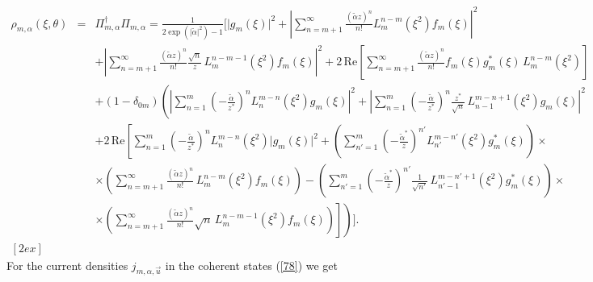 \documentclass[aps,showpacs,showkeys]{revtex4}
\begin{document}
\begin{eqnarray*}
 	\nonumber \rho_{m,\alpha}(\xi,\theta)&=&\Pi^{\dagger}_{m,\alpha} \Pi_{m,\alpha} =\frac1{2\exp(\vert\tilde{\alpha}\vert^2)-1}\Bigg[\vert g_m(\xi)\vert^2+\left\vert\sum_{n=m+1}^{\infty}\frac{\left(\tilde{\alpha}z\right)^n}{n!}L_{m}^{n-m}(\xi^2)f_m(\xi)\right\vert^2\\
 	\nonumber&&+\left\vert\sum_{n=m+1}^{\infty}\frac{\left(\tilde{\alpha} z\right)^n}{n!}\frac{\sqrt{n}}{z}\, L_{m}^{n-m-1}(\xi^2)f_m(\xi)\right\vert^2+2\,\textrm{Re}\left[\sum_{n=m+1}^{\infty}\frac{(\tilde{\alpha}z)^n}{n!}f_m(\xi)g_m^\ast(\xi)\, L_{m}^{n-m}(\xi^2)\right]\\
 	\nonumber&&+(1-\delta_{0m})\left(\left\vert\sum_{n=1}^{m}\left(-\frac{\tilde{\alpha} }{z^\ast}\right)^nL_{n}^{m-n}(\xi^2)g_m(\xi)\right\vert^2+\left\vert\sum_{n=1}^{m}\left(-\frac{\tilde{\alpha}}{z^\ast}\right)^n\frac{z^\ast}{\sqrt{n}}\,  L_{n-1}^{m-n+1}(\xi^2)g_m(\xi)\right\vert^2\right. \\
	\nonumber&&+2\, \textrm{Re}\left[\sum_{n=1}^{m}\left(-\frac{\tilde{\alpha}}{z^\ast}\right)^nL_n^{m-n}(\xi^2)\vert g_m(\xi)\vert^2+\left(\sum_{n'=1}^{m}\left(-\frac{\tilde{\alpha}^\ast}{z}\right)^{n'}L_{n'}^{m-n'}(\xi^2)g_m^\ast(\xi)\right)\times\right. \\
	\nonumber&&\times\left(\sum_{n=m+1}^{\infty}\frac{\left(\tilde{\alpha}z\right)^n}{n!}\, L_{m}^{n-m}(\xi^2)f_m(\xi)\right)-\left(\sum_{n'=1}^{m}\left(-\frac{\tilde{\alpha}^\ast}{z}\right)^{n'}\frac{1}{\sqrt{n'}}\, L_{n'-1}^{m-n'+1}(\xi^2)g_m^\ast(\xi)\right)\times \\
	&&\times\left.\left.\left(\sum_{n=m+1}^{\infty}\frac{\left(\tilde{\alpha}z\right)^n}{n!}\sqrt{n}\, L_{m}^{n-m-1}(\xi^2)f_m(\xi)\right)\right]\right)\Bigg].\label{80a} 
	\\ [2ex]
\end{eqnarray*}
For the current densities $j_{m,\alpha,\vec{u}}$ in the coherent states (\ref{78}) we get
\end{document}
